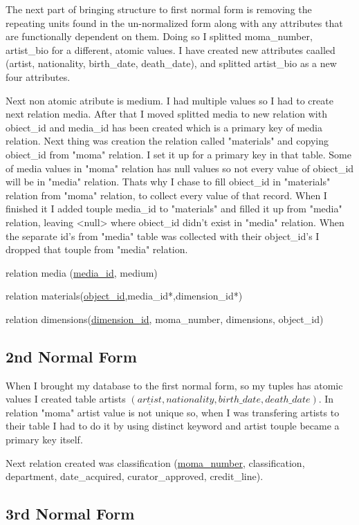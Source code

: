 \documentclass[journal,transmag]{IEEEtran}
\begin{document}
The next part of bringing structure to first normal form is removing the repeating units found in the un-normalized form along with any attributes that are functionally dependent on them. Doing so I splitted moma\_number, artist\_bio for a different, atomic values. I have created new attributes caalled (artist, nationality, birth\_date, death\_date), and splitted artist\_bio as a new four attributes. 
\newline

Next non atomic atribute is medium. I had multiple values so I had to create next relation media. After that I moved splitted media to new relation with obiect\_id and media\_id has been created which is a primary key of media relation. Next thing was creation the relation called "materials" and copying obiect\_id from "moma" relation. I set it up for a primary key in that table. Some of media values in "moma" relation has null values so not every value of obiect\_id will be in "media" relation. Thats why I chase to fill obiect\_id in "materials" relation from "moma" relation, to collect every value of that record. When I finished it I added touple media\_id to "materials" and filled it up from "media" relation, leaving <null> where obiect\_id didn't exist in "media" relation. When the separate id's from "media" table was collected with their object\_id's I dropped that touple from "media" relation. 

relation media (\underline{media\_id}, medium)

relation materials(\underline{object\_id},media\_id*,dimension\_id*)

relation dimensions(\underline{dimension\_id}, moma\_number, dimensions, object\_id)

\subsection {2nd Normal Form} 

When I brought my database to the first normal form, so my tuples has atomic values I created table artists $(\underline{artist}, nationality, birth\_date, death\_date)$. In relation "moma" artist value is not unique so, when I was transfering artists to their table I had to do it by using distinct keyword and artist touple became a primary key itself. 

Next relation created was classification (\underline{moma\_number}, classification, department, date\_acquired, curator\_approved, credit\_line). 

\subsection {3rd Normal Form}
\end{document}
